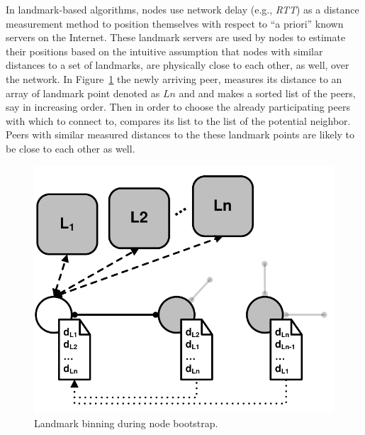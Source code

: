 In landmark-based algorithms, nodes use network delay (e.g., \emph{RTT}) as a
distance measurement method to position themselves with respect to ``a priori''
known servers on the Internet. 
These landmark servers are used
by nodes to estimate their positions based on the intuitive assumption that
nodes
with similar distances to a set of landmarks, are physically close to each
other, as well, over the network. 
In Figure~\ref{figure:landmarking} the newly
arriving peer, measures its distance to an array of landmark point denoted as
$Ln$ and and makes a sorted list of the peers, say in increasing order. Then in
order to choose the already participating peers with which to connect to,
compares its list to the list of the potential neighbor. Peers with similar
measured distances to the these landmark points are likely to be close to
each other as well.
\begin{figure}[ht]
\centering
  \includegraphics[scale=0.4]{img/pdf/landmarking.pdf}
\caption{Landmark binning during node bootstrap.}
\label{figure:landmarking}
\end{figure}


